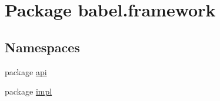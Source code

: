 \hypertarget{namespacebabel_1_1framework}{\section{Package babel.\-framework}
\label{namespacebabel_1_1framework}
}
\subsection*{Namespaces}
\begin{DoxyCompactItemize}
\item 
package \hyperlink{namespacebabel_1_1framework_1_1api}{api}
\item 
package \hyperlink{namespacebabel_1_1framework_1_1impl}{impl}
\end{DoxyCompactItemize}
